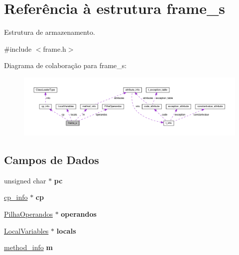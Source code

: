 \hypertarget{structframe__s}{}\section{Referência à estrutura frame\+\_\+s}
\label{structframe__s}


Estrutura de armazenamento.  




{\ttfamily \#include $<$frame.\+h$>$}



Diagrama de colaboração para frame\+\_\+s\+:
\nopagebreak
\begin{figure}[H]
\begin{center}
\leavevmode
\includegraphics[width=350pt]{structframe__s__coll__graph}
\end{center}
\end{figure}
\subsection*{Campos de Dados}
\begin{DoxyCompactItemize}
\item 
\mbox{\label{structframe__s_a74703c716b34b0be42af1c698ef9f621}} 
unsigned char $\ast$ {\bfseries pc}
\item 
\mbox{\label{structframe__s_a9e281d20d1a4393e4744dd1d07de5126}} 
\hyperlink{structcp__info}{cp\+\_\+info} $\ast$ {\bfseries cp}
\item 
\mbox{\label{structframe__s_a5377bbe53d53c855f8e11544cb26c9d2}} 
\hyperlink{classPilhaOperandos}{Pilha\+Operandos} $\ast$ {\bfseries operandos}
\item 
\mbox{\label{structframe__s_a4c0fe214398d7c0b688465bbed8a36d1}} 
\hyperlink{classLocalVariables}{Local\+Variables} $\ast$ {\bfseries locals}
\item 
\mbox{\label{structframe__s_aa771844a4dc507d1c37bfb5b378889e3}} 
\hyperlink{structmethod__info}{method\+\_\+info} {\bfseries m}
\end{DoxyCompactItemize}


